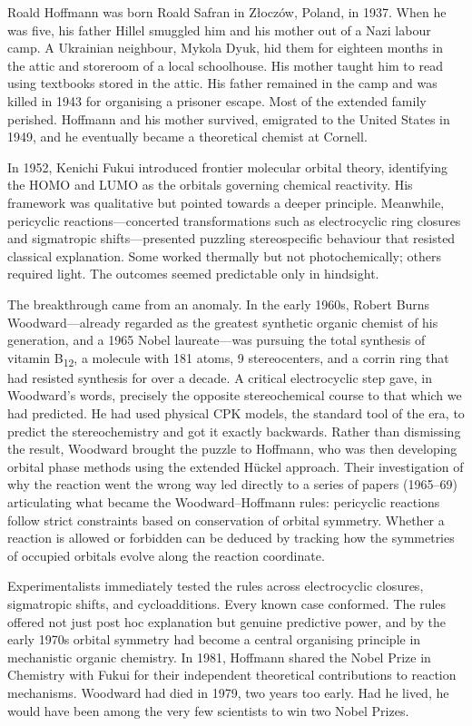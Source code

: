 \begin{historical}
Roald Hoffmann was born Roald Safran in Złoczów, Poland, in 1937. When he was five, his father Hillel smuggled him and his mother out of a Nazi labour camp. A Ukrainian neighbour, Mykola Dyuk, hid them for eighteen months in the attic and storeroom of a local schoolhouse. His mother taught him to read using textbooks stored in the attic. His father remained in the camp and was killed in 1943 for organising a prisoner escape. Most of the extended family perished. Hoffmann and his mother survived, emigrated to the United States in 1949, and he eventually became a theoretical chemist at Cornell.

In 1952, Kenichi Fukui introduced frontier molecular orbital theory, identifying the HOMO and LUMO as the orbitals governing chemical reactivity. His framework was qualitative but pointed towards a deeper principle. Meanwhile, pericyclic reactions—concerted transformations such as electrocyclic ring closures and sigmatropic shifts—presented puzzling stereospecific behaviour that resisted classical explanation. Some worked thermally but not photochemically; others required light. The outcomes seemed predictable only in hindsight.

The breakthrough came from an anomaly. In the early 1960s, Robert Burns Woodward—already regarded as the greatest synthetic organic chemist of his generation, and a 1965 Nobel laureate—was pursuing the total synthesis of vitamin B\textsubscript{12}, a molecule with 181 atoms, 9 stereocenters, and a corrin ring that had resisted synthesis for over a decade. A critical electrocyclic step gave, in Woodward's words, \QSOpen{}precisely the opposite stereochemical course to that which we had predicted.\QSClose{} He had used physical CPK models, the standard tool of the era, to predict the stereochemistry and got it exactly backwards. Rather than dismissing the result, Woodward brought the puzzle to Hoffmann, who was then developing orbital phase methods using the extended Hückel approach. Their investigation of why the reaction went the \QSOpen{}wrong\QSClose{} way led directly to a series of papers (1965–69) articulating what became the Woodward–Hoffmann rules: pericyclic reactions follow strict constraints based on conservation of orbital symmetry. Whether a reaction is allowed or forbidden can be deduced by tracking how the symmetries of occupied orbitals evolve along the reaction coordinate.

Experimentalists immediately tested the rules across electrocyclic closures, sigmatropic shifts, and cycloadditions. Every known case conformed. The rules offered not just post hoc explanation but genuine predictive power, and by the early 1970s orbital symmetry had become a central organising principle in mechanistic organic chemistry. In 1981, Hoffmann shared the Nobel Prize in Chemistry with Fukui for their independent theoretical contributions to reaction mechanisms. Woodward had died in 1979, two years too early. Had he lived, he would have been among the very few scientists to win two Nobel Prizes.
\end{historical}
